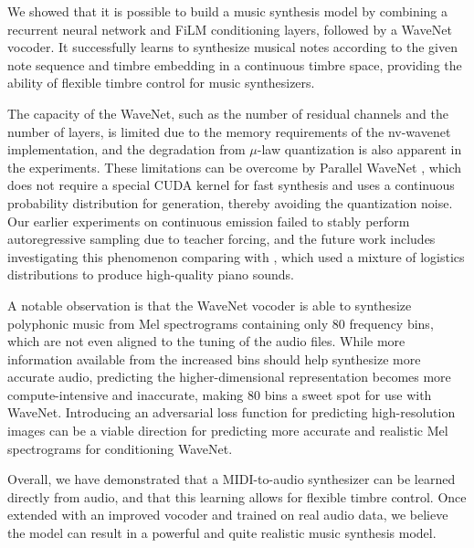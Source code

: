 We showed that it is possible to build a music synthesis model by combining a recurrent neural network and FiLM conditioning layers, followed by a WaveNet vocoder.
It successfully learns to synthesize musical notes according to the given note sequence and timbre embedding in a continuous timbre space, providing the ability of flexible timbre control for music synthesizers.

The capacity of the WaveNet, such as the number of residual channels and the number of layers, is limited due to the memory requirements of the nv-wavenet implementation, and the degradation from $\mu$-law quantization is also apparent in the experiments.
These limitations can be overcome by Parallel WaveNet \cite{oord2017parallel}, which does not require a special CUDA kernel for fast synthesis and uses a continuous probability distribution for generation, thereby avoiding the quantization noise.
Our earlier experiments on continuous emission failed to stably perform autoregressive sampling due to teacher forcing, and the future work includes investigating this phenomenon comparing with \cite{anonymous2019maestro}, which used a mixture of logistics distributions to produce high-quality piano sounds.

A notable observation is that the WaveNet vocoder is able to synthesize polyphonic music from Mel spectrograms containing only 80 frequency bins, which are not even aligned to the tuning of the audio files.
While more information available from the increased bins should help synthesize more accurate audio, predicting the higher-dimensional representation becomes more compute-intensive and inaccurate, making 80 bins a sweet spot for use with WaveNet.
Introducing an adversarial loss function for predicting high-resolution images \cite{ledig2017srgan} can be a viable direction for predicting more accurate and realistic Mel spectrograms for conditioning WaveNet.

Overall, we have demonstrated that a MIDI-to-audio synthesizer can be learned directly from audio, and that this learning allows for flexible timbre control.
Once extended with an improved vocoder and trained on real audio data, we believe the model can result in a powerful and quite realistic music synthesis model.
